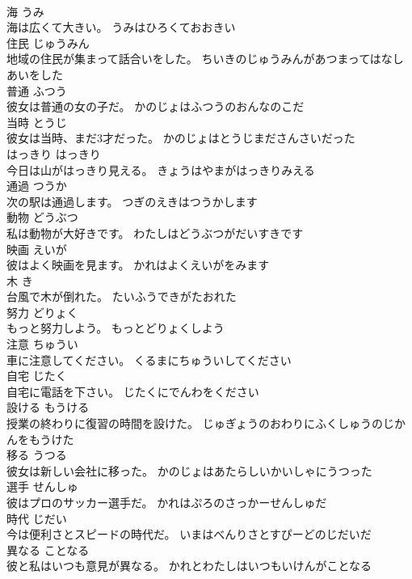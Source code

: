 \documentclass[8pt]{extreport}
\begin{document}
\begin{CJK}{UTF8}{min}
\\	海	うみ	
\\	海は広くて大きい。	うみはひろくておおきい	
\\	住民	じゅうみん	
\\	地域の住民が集まって話合いをした。	ちいきのじゅうみんがあつまってはなしあいをした	
\\	普通	ふつう	
\\	彼女は普通の女の子だ。	かのじょはふつうのおんなのこだ	
\\	当時	とうじ	
\\	彼女は当時、まだ3才だった。	かのじょはとうじまださんさいだった	
\\	はっきり	はっきり	
\\	今日は山がはっきり見える。	きょうはやまがはっきりみえる	
\\	通過	つうか	
\\	次の駅は通過します。	つぎのえきはつうかします	
\\	動物	どうぶつ	
\\	私は動物が大好きです。	わたしはどうぶつがだいすきです	
\\	映画	えいが	
\\	彼はよく映画を見ます。	かれはよくえいがをみます	
\\	木	き	
\\	台風で木が倒れた。	たいふうできがたおれた	
\\	努力	どりょく	
\\	もっと努力しよう。	もっとどりょくしよう	
\\	注意	ちゅうい	
\\	車に注意してください。	くるまにちゅういしてください	
\\	自宅	じたく	
\\	自宅に電話を下さい。	じたくにでんわをください	
\\	設ける	もうける	
\\	授業の終わりに復習の時間を設けた。	じゅぎょうのおわりにふくしゅうのじかんをもうけた	
\\	移る	うつる	
\\	彼女は新しい会社に移った。	かのじょはあたらしいかいしゃにうつった	
\\	選手	せんしゅ	
\\	彼はプロのサッカー選手だ。	かれはぷろのさっかーせんしゅだ	
\\	時代	じだい	
\\	今は便利さとスピードの時代だ。	いまはべんりさとすぴーどのじだいだ	
\\	異なる	ことなる	
\\	彼と私はいつも意見が異なる。	かれとわたしはいつもいけんがことなる	

\end{CJK}
\end{document}
